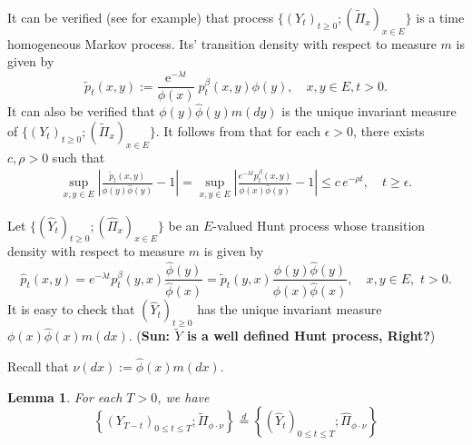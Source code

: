 \documentclass[12pt,a4paper]{amsart}
\numberwithin{equation}{section}
\theoremstyle{plain}
\newtheorem{lem}[thm]{Lemma}
\theoremstyle{definition}
\begin{document}
It can be verified (see \cite{KimSong2008Intrinsic} for example) that process $\{(Y_t)_{t\geq 0}; (\widetilde\Pi_x)_{x\in E}\}$ is a time homogeneous Markov process.
Its' transition density with respect to measure $m$ is given by
\begin{equation}
  \label{eq:tilde_p}
  \widetilde p_t(x, y)
  :=\frac{\mbox{e}^{-\lambda t}}{\phi(x)}\ p^\beta_t(x, y)\phi(y),
  \quad x,y \in E,t>0.
\end{equation}
It can also be verified that $\phi(y)\widehat{\phi}(y)m(dy)$ is the unique invariant measure of $\{(Y_t)_{t\geq 0}; (\widetilde\Pi_x)_{x\in E}\}$.
It follows from \cite[Theorem 2.7]{KimSong2008Intrinsic} that for each $\epsilon > 0$, there exists $c, \rho > 0$ such that 
\begin{align}
\label{eq:IU}
	\sup_{x,y\in E}\left|\frac{\widetilde p_t(x,y)}{\phi(y) \widehat\phi(y)}- 1\right|
	=\sup_{x,y\in E}\left|\frac{e^{-\lambda t}p^\beta_t(x,y)}{\phi(x) \widehat\phi(y)}- 1\right|
	\leq c\,e^{-\rho t},
	\quad t\geq \epsilon.
\end{align}
\par
Let $\{(\widehat{Y}_t)_{t\geq 0}; (\widehat{\Pi}_x)_{x\in E}\}$ be an $E$-valued Hunt process whose transition density with respect to measure $m$ is given by
\[
  \widehat{p}_t(x,y)
  =e^{-\lambda t}p^\beta_t(y,x)\frac{{\widehat\phi}(y)}{{\widehat\phi}(x)}
  =\widetilde p_t(y,x)\frac{\phi(y){\widehat\phi}(y)}{\phi(x){\widehat\phi}(x)},
  \quad x,y \in E,\,\, t> 0.
\]
It is easy to check that $(\widehat Y_t)_{t\geq 0}$ has the unique invariant measure $\phi(x)\widehat\phi(x)m(dx)$.
({\bf Sun: $\widetilde Y$ is a well defined Hunt process, Right?})
\par
Recall that $\nu(dx):=\widehat\phi(x)m(dx)$.
\begin{lem}
  \label{lem:referse_of_the_spine}
	For each $T > 0$, we have
  \[
    \left \{(Y_{T-t})_{0\leq t\leq T}; \widetilde \Pi_{\phi \cdot \nu} \right\}
    \overset{d}{=} \left\{ ( \widehat Y_{t} )_{0\leq t\leq T}; \widehat \Pi_{\phi \cdot \nu} \right\}
  \]
\end{lem}
\end{document}

